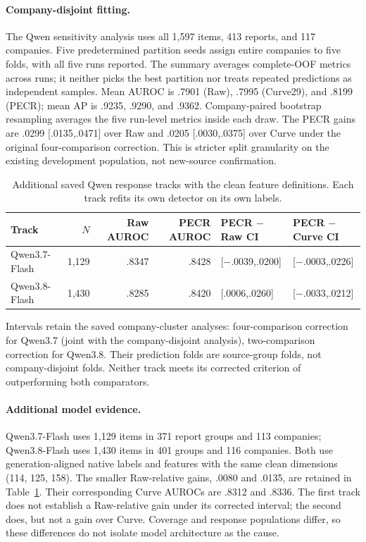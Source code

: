 \paragraph{Company-disjoint fitting.}
The Qwen sensitivity analysis uses all 1,597 items, 413 reports, and 117 companies. Five predetermined partition seeds assign entire companies to five folds, with all five runs reported. The summary averages complete-OOF metrics across runs; it neither picks the best partition nor treats repeated predictions as independent samples. Mean AUROC is .7901 (Raw), .7995 (Curve29), and .8199 (PECR); mean AP is .9235, .9290, and .9362. Company-paired bootstrap resampling averages the five run-level metrics inside each draw. The PECR gains are .0299 [.0135,.0471] over Raw and .0205 [.0030,.0375] over Curve under the original four-comparison correction. This is stricter split granularity on the existing development population, not new-source confirmation.

\begin{table}[t]
\centering\small
\caption{Additional saved Qwen response tracks with the clean feature definitions. Each track refits its own detector on its own labels.}
\label{tab:additional-models}
\begin{tabular}{@{}lrrrll@{}}
\toprule
Track & $N$ & Raw AUROC & PECR AUROC & PECR $-$ Raw CI & PECR $-$ Curve CI\\\midrule
Qwen3.7-Flash & 1,129 & .8347 & .8428 & [$-$.0039,.0200] & [$-$.0003,.0226]\\
Qwen3.8-Flash & 1,430 & .8285 & .8420 & [.0006,.0260] & [$-$.0033,.0212]\\\bottomrule
\end{tabular}
\par\vspace{3pt}\begin{minipage}{\textwidth}\footnotesize Intervals retain the saved company-cluster analyses: four-comparison correction for Qwen3.7 (joint with the company-disjoint analysis), two-comparison correction for Qwen3.8. Their prediction folds are source-group folds, not company-disjoint folds. Neither track meets its corrected criterion of outperforming both comparators.\end{minipage}
\end{table}

\paragraph{Additional model evidence.}
Qwen3.7-Flash uses 1,129 items in 371 report groups and 113 companies; Qwen3.8-Flash uses 1,430 items in 401 groups and 116 companies. Both use generation-aligned native labels and features with the same clean dimensions (114, 125, 158). The smaller Raw-relative gains, .0080 and .0135, are retained in Table~\ref{tab:additional-models}. Their corresponding Curve AUROCs are .8312 and .8336. The first track does not establish a Raw-relative gain under its corrected interval; the second does, but not a gain over Curve. Coverage and response populations differ, so these differences do not isolate model architecture as the cause.

